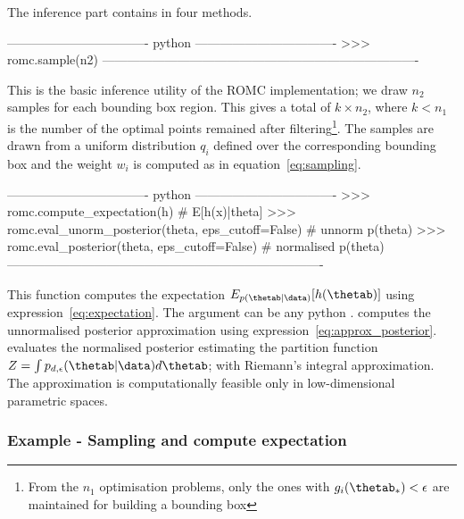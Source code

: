 The inference part contains in four methods.

\begin{Code}
---------------------------------- python ----------------------------------
>>> romc.sample(n2)
----------------------------------------------------------------------------
\end{Code}

\noindent
This is the basic inference utility of the ROMC implementation; we
draw $n_2$ samples for each bounding box region. This gives a total of
$k \times n_2$, where $k < n_1$ is the number of the optimal points
remained after filtering\footnote{From the $n_1$ optimisation
  problems, only the ones with $g_i(\thetab_*) < \epsilon$ are
  maintained for building a bounding box}. The samples are drawn from
a uniform distribution $q_i$ defined over the corresponding bounding
box and the weight $w_i$ is computed as in
equation~\eqref{eq:sampling}.

\begin{Code}
---------------------------------- python ----------------------------------
>>> romc.compute_expectation(h) # E[h(x)|theta]
>>> romc.eval_unorm_posterior(theta, eps_cutoff=False) # unnorm p(theta)
>>> romc.eval_posterior(theta, eps_cutoff=False) # normalised p(theta)
----------------------------------------------------------------------------
\end{Code}

\noindent
This function computes the expectation
$E_{p(\thetab|\data)}[h(\thetab)]$ using
expression~\eqref{eq:expectation}. The argument  can be any
python .  computes the
unnormalised posterior approximation using
expression~\eqref{eq:approx_posterior}. 
evaluates the normalised posterior estimating the partition function
$Z = \int p_{d,\epsilon}(\thetab|\data)d\thetab$; with Riemann's
integral approximation. The approximation is computationally feasible
only in low-dimensional parametric spaces.

\subsubsection*{Example - Sampling and compute expectation}

